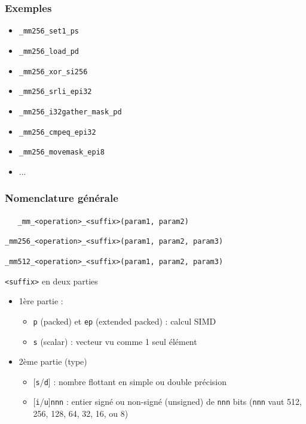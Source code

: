 \documentclass[xcolor={x11names,svgnames}]{beamer}
\begin{document}

\begin{frame}[fragile=singleslide]
  \frametitle{Exemples}

  \begin{itemize}
  \item \texttt{_mm256_set1_ps}
  \item \texttt{_mm256_load_pd}
  \item \texttt{_mm256_xor_si256}
  \item \texttt{_mm256_srli_epi32}
  \item \texttt{_mm256_i32gather_mask_pd}
  \item \texttt{_mm256_cmpeq_epi32}
  \item \texttt{_mm256_movemask_epi8}
  \item ...
  \end{itemize}
\end{frame}


\begin{frame}[fragile=singleslide]
  \frametitle{Nomenclature générale}

  \begin{center}
    \verb|   _mm_<operation>_<suffix>(param1, param2)        |
    
    \verb|_mm256_<operation>_<suffix>(param1, param2, param3)|

    \verb|_mm512_<operation>_<suffix>(param1, param2, param3)|
  \end{center}

  \begin{block}{\texttt{<suffix>} en deux parties}
    \begin{itemize}
    \item 1ère partie :
      \begin{itemize}
      \item \texttt{p} (packed) et \texttt{ep} (extended packed) : calcul SIMD
      \item \texttt{s} (scalar) : vecteur vu comme 1 seul élément
      \end{itemize}

    
  \item 2ème partie (type)
    \begin{itemize}
    \item{}  [\texttt{s}/\texttt{d}] : nombre flottant en simple ou double précision
    \item{} [\texttt{i}/\texttt{u}]\texttt{nnn} : entier signé ou non-signé (unsigned) de \texttt{nnn} bits (\texttt{nnn} vaut 512, 256, 128, 64, 32, 16, ou 8)
    \end{itemize}
  \end{itemize}
\end{block}
\end{frame}
\end{document}
